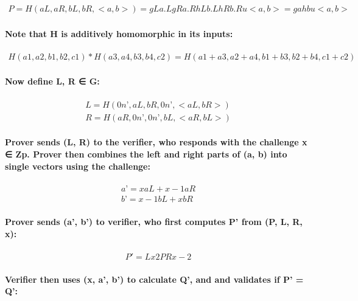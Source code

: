\documentclass{article}
\begin{document}
\begin{eqnarray}
  P = H(aL, aR, bL, bR, <a, b>) = gLa.L gRa.R hLb.L hRb.R u<a, b> = ga hb u<a, b>
\end{eqnarray}

\paragraph{Note that H is additively homomorphic in its inputs:}

\begin{eqnarray}
  H(a1, a2, b1, b2, c1)*H(a3, a4, b3, b4, c2) = H(a1 + a3, a2 + a4, b1 + b3, b2 + b4, c1+c2)
\end{eqnarray}

\paragraph{Now define L, R ∈ G:}

\begin{eqnarray}
  L = H(0n’, aL, bR, 0n’, <aL, bR>)\\
  R = H(aR, 0n’, 0n’, bL, <aR, bL>)
\end{eqnarray}

\paragraph{Prover sends (L, R) to the verifier, who responds with the challenge x ∈ Zp.  Prover then combines the left and right parts of (a, b) into single vectors using the challenge:}

\begin{eqnarray}
  a’ = x aL + x-1 aR\\
  b’ = x-1 bL + x bR
\end{eqnarray}

\paragraph{Prover sends (a’, b’) to verifier, who first computes P' from (P, L, R, x):}

\begin{eqnarray}
  P'=Lx2PRx-2
\end{eqnarray}

\paragraph{Verifier then uses (x, a’, b’) to calculate Q’, and and validates if P’ = Q’: }
\end{document}

